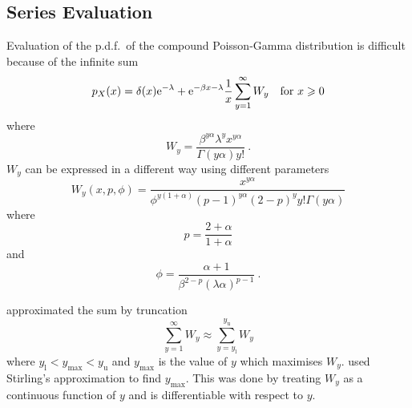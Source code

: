 \subsection{Series Evaluation}
Evaluation of the p.d.f.~of the compound Poisson-Gamma distribution is difficult because of the infinite sum
\begin{equation}
p_X(x) = 
	\delta(x) \mathrm{e}^{-\lambda}
	+
	\mathrm{e}^{-\beta x-\lambda}\frac{1}{x}\sum_{y=1}^{\infty}W_y
	\quad\text{for }x\geqslant 0
\end{equation}
where
\begin{equation}
	W_y = \frac{\beta^{y\alpha}\lambda^yx^{y\alpha}}{\Gamma(y\alpha)y!}
	\ .
	\label{eq:compoundPoisson_Wy}
\end{equation}
$W_y$ can be expressed in a different way using different parameters
\begin{equation}
	W_y(x,p,\phi)=\frac{x^{y\alpha}}{\phi^{y(1+\alpha)}(p-1)^{y\alpha}(2-p)^yy!\Gamma(y\alpha)}
\end{equation}
where
\begin{equation}
	p=\frac{2+\alpha}{1+\alpha}
\end{equation}
and
\begin{equation}
	\phi = \frac{\alpha+1}{\beta^{2-p}(\lambda\alpha)^{p-1}} \ .
\end{equation}

\cite{dunn2005series} approximated the sum by truncation
\begin{equation}
	\sum_{y=1}^\infty W_y \approx \sum_{y=y_\text{l}}^{y_\text{u}}W_y
\end{equation}
where $y_\text{l}<y_{\text{max}}<y_\text{u}$ and $y_{\text{max}}$ is the value of $y$ which maximises $W_y$. \cite{dunn2005series} used Stirling's approximation to find $y_{\text{max}}$. This was done by treating $W_y$ as a continuous function of $y$ and is differentiable with respect to $y$.

